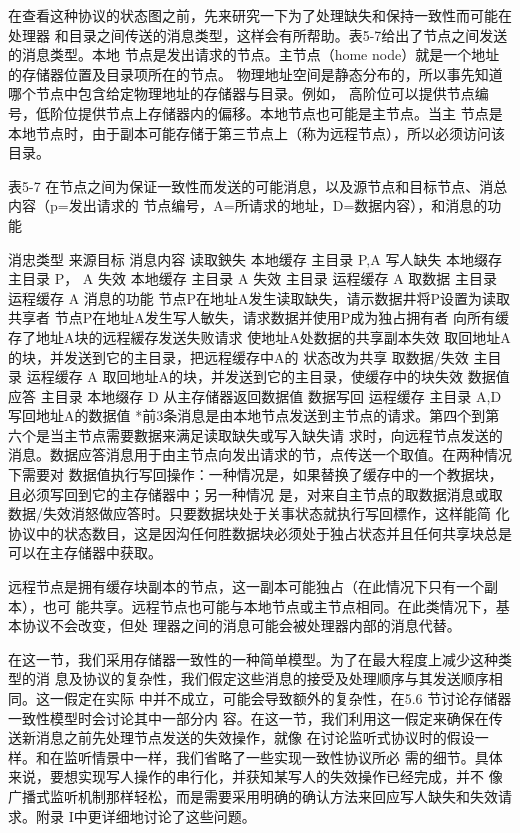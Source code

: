 在查看这种协议的状态图之前，先来研究一下为了处理缺失和保持一致性而可能在处理器
和目录之间传送的消息类型，这样会有所帮助。表5-7给出了节点之间发送的消息类型。本地
节点是发出请求的节点。主节点（home node）就是一个地址的存储器位置及目录项所在的节点。
物理地址空间是静态分布的，所以事先知道哪个节点中包含给定物理地址的存储器与目录。例如，
高阶位可以提供节点编号，低阶位提供节点上存储器内的偏移。本地节点也可能是主节点。当主
节点是本地节点时，由于副本可能存储于第三节点上（称为远程节点），所以必须访问该目录。

表5-7 在节点之间为保证一致性而发送的可能消息，以及源节点和目标节点、消总内容（p=发出请求的
节点编号，A=所请求的地址，D=数据内容），和消息的功能

消忠类型
来源目标
消息内容
读取鉠失
本地缓存 主目录
P,A
写人缺失
本地缀存
主目录
P，
A
失效
本地缓存
主目录
A
失效
主目录
运程缓存
A
取数据
主目录
运程缓存
A
消息的功能
节点P在地址A发生读取缺失，请示数据井将P设置为读取共享者
节点P在地址A发生写人敏失，请求数据并使用P成为独占拥有者
向所有缓存了地址A块的远程緩存发送失败请求
使地址A处数据的共享副本失效
取回地址A的块，并发送到它的主目录，把远程缓存中A的
状态改为共享
取数据/失效
主目录
运程缓存
A
取回地址A的块，并发送到它的主目录，使缓存中的块失效
数据值应答
主目录
本地缀存
D
从主存储器返回数据值
数据写回
运程缓存
主目录
A,D
写回地址A的数据值
*前3条消息是由本地节点发送到主节点的请求。第四个到第六个是当主节点需要數据来满足读取缺失或写入缺失请
求时，向远程节点发送的消息。数据应答消息用于由主节点向发出请求的节，点传送一个取值。在两种情况下需要对
数据值执行写回操作：一种情况是，如果替换了缓存中的一个教据块，且必须写回到它的主存储器中；另一种情况
是，对来自主节点的取数据消息或取数据/失效消怒做应答时。只要数据块处于关事状态就执行写回標作，这样能简
化协议中的状态数目，这是因沟任何胜数据块必须处于独占状态并且任何共享块总是可以在主存储器中获取。

远程节点是拥有缓存块副本的节点，这一副本可能独占（在此情况下只有一个副本），也可
能共享。远程节点也可能与本地节点或主节点相同。在此类情况下，基本协议不会改变，但处
理器之间的消息可能会被处理器内部的消息代替。

在这一节，我们采用存储器一致性的一种简单模型。为了在最大程度上减少这种类型的消
息及协议的复杂性，我们假定这些消息的接受及处理顺序与其发送顺序相同。这一假定在实际
中并不成立，可能会导致额外的复杂性，在5.6 节讨论存储器一致性模型时会讨论其中一部分内
容。在这一节，我们利用这一假定来确保在传送新消息之前先处理节点发送的失效操作，就像
在讨论监听式协议时的假设一样。和在监听情景中一样，我们省略了一些实现一致性协议所必
需的细节。具体来说，要想实现写人操作的串行化，并获知某写人的失效操作已经完成，并不
像广播式监听机制那样轻松，而是需要采用明确的确认方法来回应写人缺失和失效请求。附录
I中更详细地讨论了这些问题。
